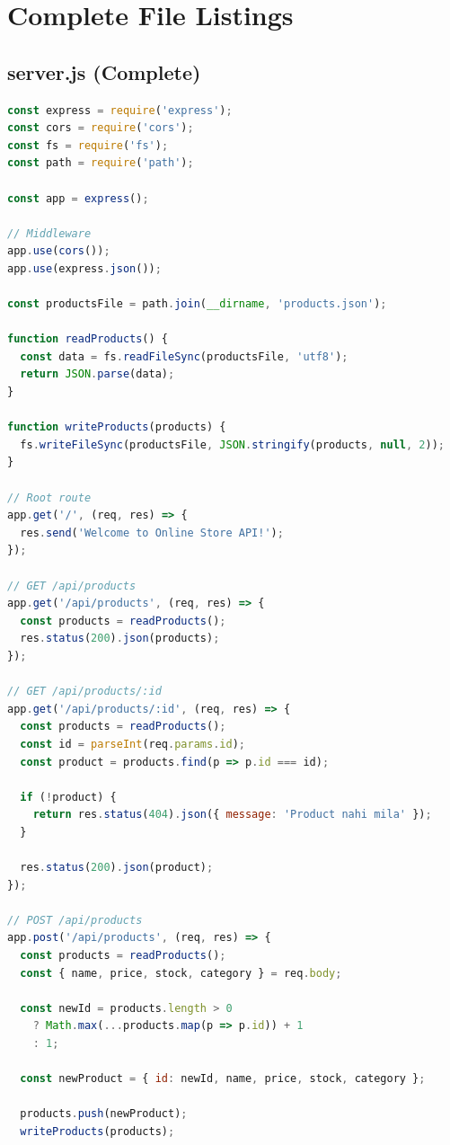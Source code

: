 \documentclass[12pt,a4paper]{article}
\begin{document}
\appendix
\section{Complete File Listings}
\label{sec:appendix}

\subsection{server.js (Complete)}
\begin{lstlisting}[language=JavaScript, caption={server.js - Full Code}]
const express = require('express');
const cors = require('cors');
const fs = require('fs');
const path = require('path');

const app = express();

// Middleware
app.use(cors());
app.use(express.json());

const productsFile = path.join(__dirname, 'products.json');

function readProducts() {
  const data = fs.readFileSync(productsFile, 'utf8');
  return JSON.parse(data);
}

function writeProducts(products) {
  fs.writeFileSync(productsFile, JSON.stringify(products, null, 2));
}

// Root route
app.get('/', (req, res) => {
  res.send('Welcome to Online Store API!');
});

// GET /api/products
app.get('/api/products', (req, res) => {
  const products = readProducts();
  res.status(200).json(products);
});

// GET /api/products/:id
app.get('/api/products/:id', (req, res) => {
  const products = readProducts();
  const id = parseInt(req.params.id);
  const product = products.find(p => p.id === id);

  if (!product) {
    return res.status(404).json({ message: 'Product nahi mila' });
  }

  res.status(200).json(product);
});

// POST /api/products
app.post('/api/products', (req, res) => {
  const products = readProducts();
  const { name, price, stock, category } = req.body;

  const newId = products.length > 0 
    ? Math.max(...products.map(p => p.id)) + 1 
    : 1;

  const newProduct = { id: newId, name, price, stock, category };

  products.push(newProduct);
  writeProducts(products);


\end{lstlisting}
\end{document}
